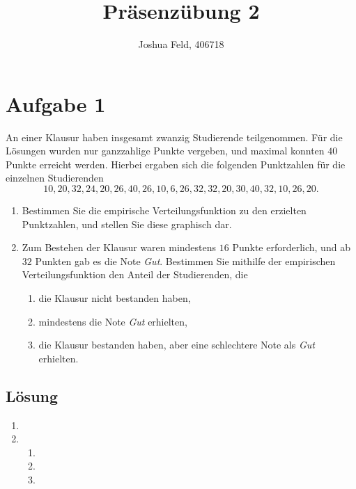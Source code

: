 \documentclass{exercise}
\institute{Institut für Statistik und Wirtschaftsmathematik}
\title{Präsenzübung 2}
\author{Joshua Feld, 406718}
\begin{document}
    \maketitle


    \section*{Aufgabe 1}

    \begin{problem}
        An einer Klausur haben insgesamt zwanzig Studierende teilgenommen. Für die Lösungen wurden nur ganzzahlige Punkte vergeben, und maximal konnten \(40\) Punkte erreicht werden.
        Hierbei ergaben sich die folgenden Punktzahlen für die einzelnen Studierenden
        \[
            10, 20, 32, 24, 20, 26, 40, 26, 10, 6, 26, 32, 32, 20, 30, 40, 32, 10, 26, 20.
        \]
        \begin{enumerate}
            \item Bestimmen Sie die empirische Verteilungsfunktion zu den erzielten Punktzahlen, und stellen Sie diese graphisch dar.
            \item Zum Bestehen der Klausur waren mindestens \(16\) Punkte erforderlich, und ab \(32\) Punkten gab es die Note \emph{Gut}.
            Bestimmen Sie mithilfe der empirischen Verteilungsfunktion den Anteil der Studierenden, die
            \begin{enumerate}
                \item die Klausur nicht bestanden haben,
                \item mindestens die Note \emph{Gut} erhielten,
                \item die Klausur bestanden haben, aber eine schlechtere Note als \emph{Gut} erhielten.
            \end{enumerate}
        \end{enumerate}
    \end{problem}

    \subsection*{Lösung}
    \begin{enumerate}
        \item
        \item
        \begin{enumerate}
            \item 
            \item 
            \item 
        \end{enumerate} 
    \end{enumerate}
\end{document}
